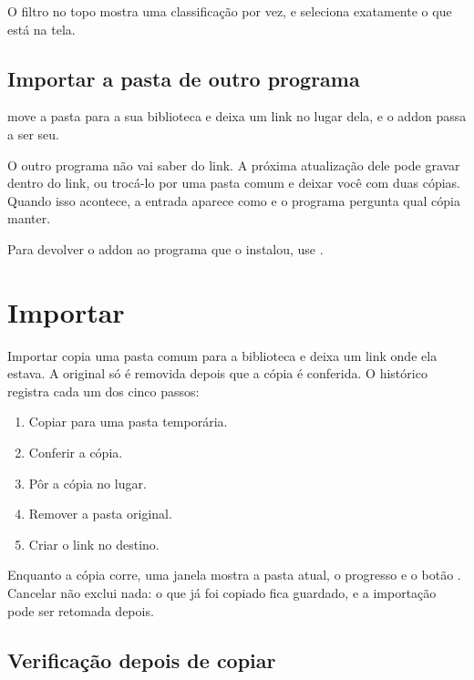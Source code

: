 \documentclass[11pt,a4paper]{article}
\begin{document}
O filtro no topo mostra uma classificação por vez, e  seleciona exatamente o que está na tela.

\subsection{Importar a pasta de outro programa}

 move a pasta para a sua biblioteca e deixa um link no
lugar dela, e o addon passa a ser seu.

O outro programa não vai saber do link. A próxima atualização dele pode gravar
dentro do link, ou trocá-lo por uma pasta comum e deixar você com duas cópias.
Quando isso acontece, a entrada aparece como  e o programa
pergunta qual cópia manter.

Para devolver o addon ao programa que o instalou, use .

\section{Importar}

Importar copia uma pasta comum para a biblioteca e deixa um link onde ela
estava. A original só é removida depois que a cópia é conferida. O histórico
registra cada um dos cinco passos:


\begin{enumerate}
  \item Copiar para uma pasta temporária.
  \item Conferir a cópia.
  \item Pôr a cópia no lugar.
  \item Remover a pasta original.
  \item Criar o link no destino.
\end{enumerate}

Enquanto a cópia corre, uma janela mostra a pasta atual, o progresso e o botão
. Cancelar não exclui nada: o que já foi copiado fica guardado, e a
importação pode ser retomada depois.

\subsection{Verificação depois de copiar}
\end{document}
